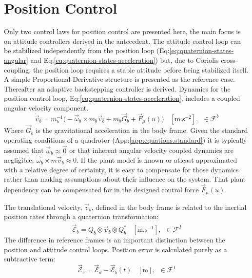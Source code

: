 {\section{Position Control}
\label{sec:control.position}
Only two control laws for position control are presented here, the main focus is on attitude controllers derived in the antecedent. The attitude control loop can be stabilized independently from the position loop (Eq:\ref{eq:quaternion-states-angular} and Eq:\ref{eq:quaternion-states-acceleration}) but, due to Coriolis cross-coupling, the position loop requires a stable attitude before being stabilized itself. A simple Proportional-Derivative structure is presented as the reference case. Thereafter an adaptive backstepping controller is derived. Dynamics for the position control loop, Eq:\ref{eq:quaternion-states-acceleration}, includes a coupled angular velocity component.
\begin{equation}\label{eq:position-deriv}
\dot{\vec{v}}_b=m_b^{-1}\big(-\vec{\omega}_b\times m_b\vec{v}_b+m_b\vec{G}_b+\vec{F}_\mu(u)\big)~~~~[\text{m.s}^{-2}],~~\in\mathcal{F}^b
\end{equation}
Where $\vec{G}_b$ is the gravitational acceleration in the body frame. Given the standard operating conditions of a quadrotor (App:\ref{app:equations.standard}) it is typically assumed that $\vec{\omega}_b\approx\vec{0}$ or that inherent angular velocity coupled dynamics are negligible; $\vec{\omega}_b\times m\vec{v}_b\approx 0$. If the plant model is known or atleast approximated with a relative degree of certainty, it is easy to compensate for those dynamics rather than making assumptions about their influence on the system. That plant dependency can be compensated for in the designed control force $\vec{F}_\mu(u)$. 
\par
The translational velocity, $\vec{v}_b$, defined in the body frame is related to the inertial position rates through a quaternion transformation:
\begin{equation}
\dot{\vec{\mathcal{E}}}_b=Q_b\otimes\vec{v}_b\otimes Q_b^*~~~~[\text{m.s}^{-1}],~~\in\mathcal{F}^I
\end{equation}
The difference in reference frames is an important distinction between the position and attitude control loops. Position error is calculated purely as a subtractive term:
\begin{equation}
\vec{\mathcal{E}}_e=\vec{\mathcal{E}}_d-\vec{\mathcal{E}}_b(t)~~~~[\text{m}],~~\in\mathcal{F}^I
\end{equation}
}
